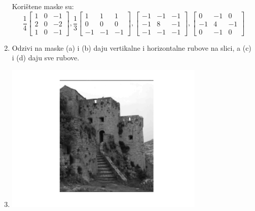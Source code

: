\documentclass[12pt, a4]{report}
\begin{document}
\begin{enumerate}
                    Korištene maske su:
                    \begin{equation}
                        \frac{1}{4}
                        \begin{bmatrix}
                            1 & 0 & -1 \\
                            2 & 0 & -2 \\
                            1 & 0 & -1
                        \end{bmatrix},
                        \frac{1}{3}
                        \begin{bmatrix}
                            1 & 1 & 1 \\
                            0 & 0 & 0 \\
                            -1 & -1 & -1
                        \end{bmatrix},
                        \begin{bmatrix}
                            -1 & -1 & -1 \\
                            -1 & 8 & -1 \\
                            -1 & -1 & -1
                        \end{bmatrix},
                        \begin{bmatrix}
                            0 & -1 & 0 \\
                            -1 & 4 & -1 \\
                            0 & -1 & 0
                        \end{bmatrix}
                    \end{equation}
                \item
                    Odzivi na maske (a) i (b) daju vertikalne i horizontalne rubove na slici, a (c) i (d) daju sve rubove.
                \item
                    \begin{minipage}{\linewidth}
                        \centering
                        \includegraphics[width=0.75\textwidth]{convAvg}

\end{minipage}
\end{enumerate}
\end{document}
